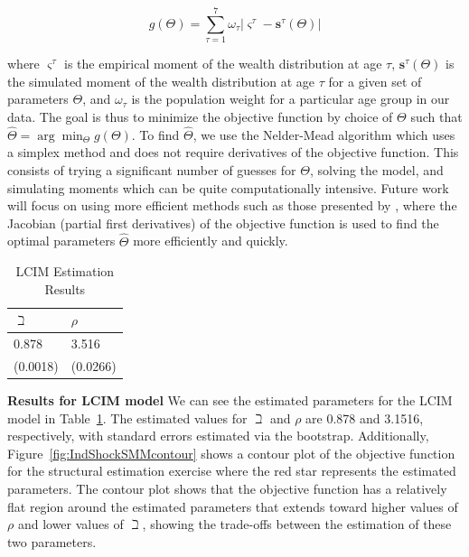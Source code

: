 \documentclass{article}
\newcommand{\CRRA}{\rho}
\newcommand{\weight}{\omega}
\begin{document}
\begin{equation}
\label{eq:naivePowell}
g(\Theta) =  \sum_{\tau=1}^{7} \weight_{\tau} |\varsigma^{\tau} -\mathbf{s}^{\tau}(\Theta)|
\end{equation}

where $\varsigma^{\tau}$ is the empirical moment of the wealth distribution at age $\tau$, $\mathbf{s}^{\tau}(\Theta)$ is the simulated moment of the wealth distribution at age $\tau$ for a given set of parameters $\Theta$, and $\weight_{\tau}$ is the population weight for a particular age group in our data. The goal is thus to minimize the objective function by choice of $\Theta$ such that  $\hat{\Theta} = \arg \min_{\Theta} g(\Theta)$. To find $\hat{\Theta}$, we use the Nelder-Mead algorithm which uses a simplex method and does not require derivatives of the objective function. This consists of trying a significant number of guesses for $\Theta$, solving the model, and simulating moments which can be quite computationally intensive. Future work will focus on using more efficient methods such as those presented by \cite{Auclert_2021}, where the Jacobian (partial first derivatives) of the objective function is used to find the optimal parameters $\hat{\Theta}$ more efficiently and quickly.

\begin{table}
\centering
\caption{LCIM Estimation Results}
\label{LCIMestimation}
\begin{tabular}{p{}p{}}
\toprule
$\beth$ & $\CRRA$ \\
\hline
0.878 & 3.516 \\
(0.0018) & (0.0266) \\
\bottomrule
\end{tabular}
\end{table}

\textbf{Results for LCIM model} We can see the estimated parameters for the LCIM model in Table~\ref{LCIMestimation}. The estimated values for $\beth$ and $\CRRA$ are 0.878 and 3.1516, respectively, with standard errors estimated via the bootstrap. Additionally, Figure~\ref{fig:IndShockSMMcontour} shows a contour plot of the objective function for the structural estimation exercise where the red star represents the estimated parameters. The contour plot shows that the objective function has a  relatively flat region around the estimated parameters that extends toward higher values of $\CRRA$ and lower values of $\beth$, showing the trade-offs between the estimation of these two parameters.
\end{document}

